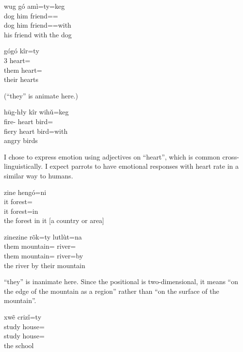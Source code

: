 \begin{exe}
    \ex
    \glll
    wug gó amì=ty=keg \\
    dog him friend=\Poss{}=\Com{} \\
    dog him friend=\Poss{}=with \\
    \glt
    his friend with the dog
\end{exe}

\begin{exe}
    \ex
    \glll
    gógó kîr=ty \\
    3\Pl{} heart=\Poss{} \\
    them heart=\Poss{} \\
    \glt
    their hearts
\end{exe}
(``they'' is animate here.)

\begin{exe}
    \ex
    \glll
    hūg-hły kîr wihǔ=keg \\
    fire-\Adj{} heart bird=\Com{} \\
    fiery heart bird=with \\
    \glt
    angry birds
\end{exe}
I chose to express emotion using adjectives on ``heart'',
which is common cross-linguistically.
I expect parrots to have emotional responses with heart rate
in a similar way to humans.

\begin{exe}
    \ex
    \glll
    zine hengó=ni \\
    it forest=\InessTwo{} \\
    it forest=in \\
    \glt
    the forest in it [a country or area]
\end{exe}

\begin{exe}
    \ex
    \glll
    zinezine rõk=ty lutlùt=na \\
    them mountain=\Poss{} river=\AdessTwo{} \\
    them mountain=\Poss{} river=by \\
    \glt
    the river by their mountain
\end{exe}
``they'' is inanimate here.
Since the positional is two-dimensional,
it means ``on the edge of the mountain as a region''
rather than ``on the surface of the mountain''.

\begin{exe}
    \ex
    \glll
    xwẽ crizǐ=ty \\
    study house=\Poss{} \\
    study house=\Poss{} \\
    \glt
    the school
\end{exe}

